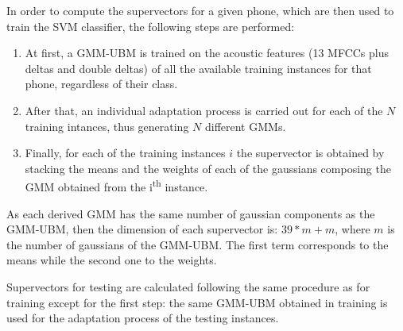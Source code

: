 In order to compute the supervectors for a given phone, which are then used to train the SVM
classifier, the following steps are performed:

\begin{enumerate}
  \item At first, a GMM-UBM is trained on the acoustic features (13 MFCCs plus deltas and double
  deltas) of all the available training instances for that phone, regardless of their class.
  \item After that, an individual adaptation process is carried out for each
  of the $N$ training intances, thus generating $N$ different GMMs.
  \item Finally, for each of the training instances $i$ the supervector is obtained by stacking
  the means and the weights of each of the gaussians composing the GMM obtained from the
  i\textsuperscript{th} instance.
\end{enumerate}

As each derived GMM has the same number of gaussian components as the GMM-UBM, then the dimension
of each supervector is: $39*m + m$, where $m$ is the number of gaussians of the GMM-UBM. The
first term corresponds to the means while the second one to the weights.

Supervectors for testing are calculated following the same procedure as for training except for
the first step: the same GMM-UBM obtained in training is used for the adaptation process of the
testing instances.
